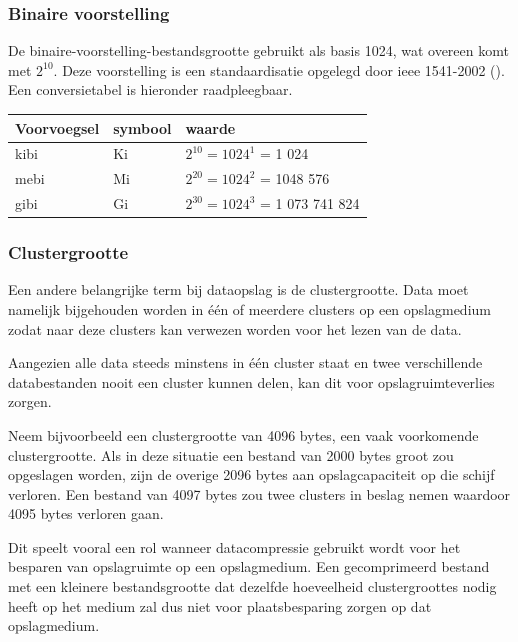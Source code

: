 \subsubsection{Binaire voorstelling}
\label{sec:bestandsgrootte-dataopslag-voorvoegsels-binair}

De \gls{binaire-voorstelling-bestandsgrootte} gebruikt als basis 1024, wat overeen komt met $ 2^{10} $. Deze voorstelling is een standaardisatie opgelegd door \gls{ieee} 1541-2002 (\cite{ieee15412002}). Een conversietabel is hieronder raadpleegbaar.

\FloatBarrier
\begin{table}[h]
	\begin{tabular}{|l|l|l|}
		\hline
		\textbf{Voorvoegsel} & \textbf{symbool} & \textbf{waarde} \\ \hline
		kibi & Ki & $ 2^{10} = 1024^{1} $  = 1 024 \\ \hline
		mebi & Mi & $ 2^{20} = 1024^{2} $ = 1048 576 \\ \hline
		gibi & Gi & $ 2^{30} = 1024^{3} $ = 1 073 741 824 \\ \hline
	\end{tabular}
\end{table}
\FloatBarrier

\subsubsection{Clustergrootte}
\label{sec:bestandsgrootte-dataopslag-clustergrootte}

Een andere belangrijke term bij dataopslag is de \gls{clustergrootte}. Data moet namelijk bijgehouden worden in één of meerdere \glspl{cluster} op een opslagmedium zodat naar deze \glspl{cluster} kan verwezen worden voor het lezen van de data. 

Aangezien alle data steeds minstens in één \gls{cluster} staat en twee verschillende databestanden nooit een \gls{cluster} kunnen delen, kan dit voor opslagruimteverlies zorgen. 

Neem bijvoorbeeld een \gls{clustergrootte} van 4096 \glspl{byte}, een vaak voorkomende \gls{clustergrootte}. Als in deze situatie een bestand van 2000 \glspl{byte} groot zou opgeslagen worden, zijn de overige 2096 \glspl{byte} aan opslagcapaciteit op die schijf verloren. Een bestand van 4097 \glspl{byte} zou twee \glspl{cluster} in beslag nemen waardoor 4095 \glspl{byte} verloren gaan. 

Dit speelt vooral een rol wanneer \gls{datacompressie} gebruikt wordt voor het besparen van opslagruimte op een opslagmedium. Een gecomprimeerd bestand met een kleinere bestandsgrootte dat dezelfde hoeveelheid \glspl{clustergrootte} nodig heeft op het medium zal dus niet voor plaatsbesparing zorgen op dat opslagmedium. 

